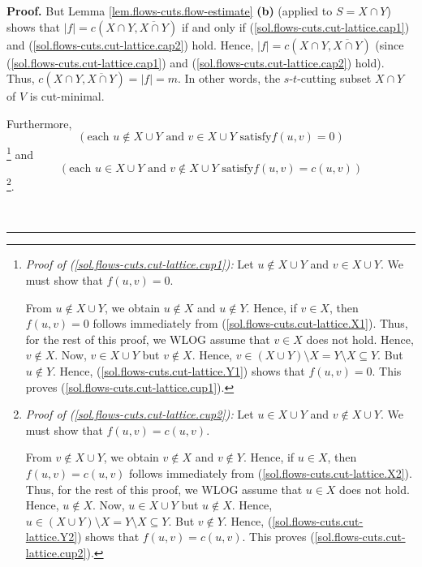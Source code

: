 \documentclass[numbers=enddot,12pt,final,onecolumn,notitlepage]{scrartcl}%
\theoremstyle{definition}
\newenvironment{proof}[1][Proof]{\noindent\textbf{#1.} }{\ \rule{0.5em}{0.5em}}
\begin{document}
\begin{proof}
But Lemma \ref{lem.flows-cuts.flow-estimate} \textbf{(b)} (applied to $S=X\cap
Y$) shows that $\left\vert f\right\vert =c\left(  X\cap Y,\overline{X\cap
Y}\right)  $ if and only if (\ref{sol.flows-cuts.cut-lattice.cap1}) and
(\ref{sol.flows-cuts.cut-lattice.cap2}) hold. Hence, $\left\vert f\right\vert
=c\left(  X\cap Y,\overline{X\cap Y}\right)  $ (since
(\ref{sol.flows-cuts.cut-lattice.cap1}) and
(\ref{sol.flows-cuts.cut-lattice.cap2}) hold). Thus, $c\left(  X\cap
Y,\overline{X\cap Y}\right)  =\left\vert f\right\vert =m$. In other words, the
$s$-$t$-cutting subset $X\cap Y$ of $V$ is cut-minimal.

Furthermore,
\begin{equation}
\left(  \text{each }u\notin X\cup Y\text{ and }v\in X\cup Y\text{ satisfy
}f\left(  u,v\right)  =0\right)  \label{sol.flows-cuts.cut-lattice.cup1}%
\end{equation}
\footnote{\textit{Proof of (\ref{sol.flows-cuts.cut-lattice.cup1}):} Let
$u\notin X\cup Y$ and $v\in X\cup Y$. We must show that $f\left(  u,v\right)
=0$.
\par
From $u\notin X\cup Y$, we obtain $u\notin X$ and $u\notin Y$. Hence, if $v\in
X$, then $f\left(  u,v\right)  =0$ follows immediately from
(\ref{sol.flows-cuts.cut-lattice.X1}). Thus, for the rest of this proof, we
WLOG assume that $v\in X$ does not hold. Hence, $v\notin X$. Now, $v\in X\cup
Y$ but $v\notin X$. Hence, $v\in\left(  X\cup Y\right)  \setminus X=Y\setminus
X\subseteq Y$. But $u\notin Y$. Hence, (\ref{sol.flows-cuts.cut-lattice.Y1})
shows that $f\left(  u,v\right)  =0$. This proves
(\ref{sol.flows-cuts.cut-lattice.cup1}).} and%
\begin{equation}
\left(  \text{each }u\in X\cup Y\text{ and }v\notin X\cup Y\text{ satisfy
}f\left(  u,v\right)  =c\left(  u,v\right)  \right)
\label{sol.flows-cuts.cut-lattice.cup2}%
\end{equation}
\footnote{\textit{Proof of (\ref{sol.flows-cuts.cut-lattice.cup2}):} Let $u\in
X\cup Y$ and $v\notin X\cup Y$. We must show that $f\left(  u,v\right)
=c\left(  u,v\right)  $.
\par
From $v\notin X\cup Y$, we obtain $v\notin X$ and $v\notin Y$. Hence, if $u\in
X$, then $f\left(  u,v\right)  =c\left(  u,v\right)  $ follows immediately
from (\ref{sol.flows-cuts.cut-lattice.X2}). Thus, for the rest of this proof,
we WLOG assume that $u\in X$ does not hold. Hence, $u\notin X$. Now, $u\in
X\cup Y$ but $u\notin X$. Hence, $u\in\left(  X\cup Y\right)  \setminus
X=Y\setminus X\subseteq Y$. But $v\notin Y$. Hence,
(\ref{sol.flows-cuts.cut-lattice.Y2}) shows that $f\left(  u,v\right)
=c\left(  u,v\right)  $. This proves (\ref{sol.flows-cuts.cut-lattice.cup2}).}.


\end{proof}
\end{document}
